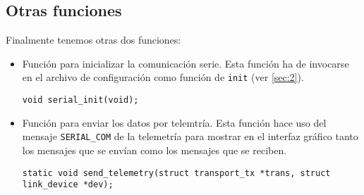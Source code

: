  \subsection{Otras funciones}
 
 Finalmente tenemos otras dos funciones:
 \begin{itemize}
 	\item Función para inicializar la comunicación serie. Esta función ha de invocarse en el archivo de configuración como función de \texttt{init} (ver \ref{sec:2}).
 	\begin{lstlisting}[style=C]
 	void serial_init(void);
 	\end{lstlisting}
 	\item Función para enviar los datos por telemtría. Esta función hace uso del mensaje \texttt{SERIAL\_COM} de la telemetría para mostrar en el interfaz gráfico tanto los mensajes que se envían como los mensajes que se reciben.
 	\begin{lstlisting}[style=C]
 	static void send_telemetry(struct transport_tx *trans, struct link_device *dev);
 	\end{lstlisting}
 \end{itemize}
 
 
 